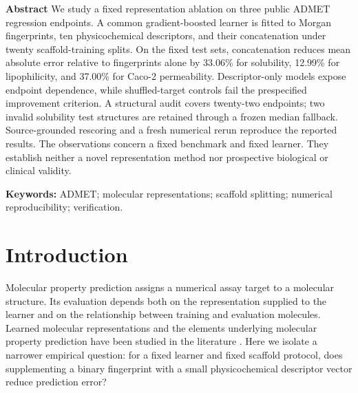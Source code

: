 \documentclass[10pt,twocolumn,a4paper]{article}
\theoremstyle{definition}\newtheorem{observation}{Numerical observation}
\theoremstyle{remark}\newtheorem{remark}{Remark}
\begin{document}
\thispagestyle{first}
\noindent\textbf{Abstract}\enspace
We study a fixed representation ablation on three public ADMET regression endpoints. A common gradient-boosted learner is fitted to Morgan fingerprints, ten physicochemical descriptors, and their concatenation under twenty scaffold-training splits. On the fixed test sets, concatenation reduces mean absolute error relative to fingerprints alone by 33.06\% for solubility, 12.99\% for lipophilicity, and 37.00\% for Caco-2 permeability. Descriptor-only models expose endpoint dependence, while shuffled-target controls fail the prespecified improvement criterion. A structural audit covers twenty-two endpoints; two invalid solubility test structures are retained through a frozen median fallback. Source-grounded rescoring and a fresh numerical rerun reproduce the reported results. The observations concern a fixed benchmark and fixed learner. They establish neither a novel representation method nor prospective biological or clinical validity.

\medskip\noindent\textbf{Keywords:} ADMET; molecular representations; scaffold splitting; numerical reproducibility; verification.

\section{Introduction}\label{sec:intro}
Molecular property prediction assigns a numerical assay target to a molecular structure. Its evaluation depends both on the representation supplied to the learner and on the relationship between training and evaluation molecules. Learned molecular representations and the elements underlying molecular property prediction have been studied in the literature \cite{yang,deng}. Here we isolate a narrower empirical question: for a fixed learner and fixed scaffold protocol, does supplementing a binary fingerprint with a small physicochemical descriptor vector reduce prediction error?
\end{document}
